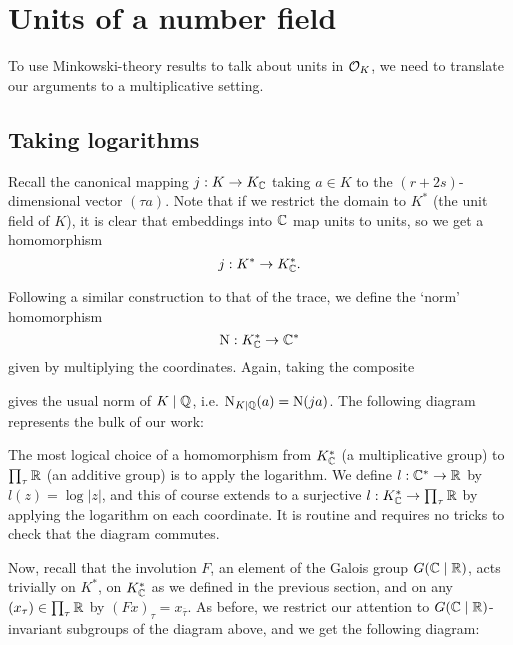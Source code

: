 \section{Units of a number field}

To use Minkowski-theory results to talk about units in $\mathcal{O}_K$, we need to translate our arguments to a multiplicative setting.

\subsection{Taking logarithms}

Recall the canonical mapping $j:K\to K_{\mathbb{C}}$ taking $a\in K$ to the $(r+2s)$-dimensional vector $(\tau a)$. Note that if we restrict the domain to $K^*$ (the unit field of $K$), it is clear that embeddings into $\mathbb{C}$ map units to units, so we get a homomorphism
\[
	j : K^* \to K^*_{\mathbb{C}}.
\]

Following a similar construction to that of the trace, we define the `norm' homomorphism
\[
	\operatorname{N} : K^*_{\mathbb{C}} \to \mathbb{C}^*
\]
given by multiplying the coordinates. Again, taking the composite
\begin{center}
\end{center}
gives the usual norm of $K\mid\mathbb{Q}$, i.e. $\operatorname{N}_{K\mid\mathbb{Q}}(a)=\operatorname{N}(ja)$. The following diagram represents the bulk of our work:
\begin{center}
\end{center}

The most logical choice of a homomorphism from $K^*_{\mathbb{C}}$ (a multiplicative group) to $\prod_\tau\mathbb{R}$ (an additive group) is to apply the logarithm. We define $l:\mathbb{C}^*\to\mathbb{R}$ by $l(z)=\log|z|$, and this of course extends to a surjective $l:K^*_{\mathbb{C}}\to\prod_\tau\mathbb{R}$ by applying the logarithm on each coordinate. It is routine and requires no tricks to check that the diagram commutes.

Now, recall that the involution $F$, an element of the Galois group $G(\mathbb{C}\mid\mathbb{R})$, acts trivially on $K^*$, on $K^*_{\mathbb{C}}$ as we defined in the previous section, and on any $(x_\tau)\in\prod_\tau\mathbb{R}$ by $(Fx)_\tau = x_{\overline{\tau}}$. As before, we restrict our attention to $G(\mathbb{C}\mid\mathbb{R})$-invariant subgroups of the diagram above, and we get the following diagram:

